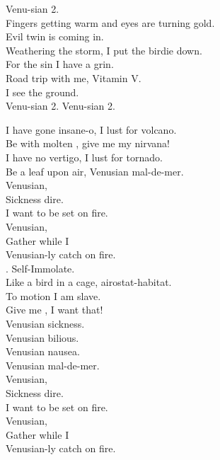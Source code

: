 Venu-sian 2. \\

Fingers getting warm and eyes are turning gold. \\
Evil twin is coming in. \\
Weathering the storm, I put the birdie down. \\
For the sin I have a grin. \\

Road trip with me, Vitamin V. \\
I see the ground. \\

Venu-sian 2. Venu-sian 2. \\





I have gone insane-o, I lust for volcano. \\
Be with molten , give me my nirvana! \\
I have no vertigo, I lust for tornado. \\
Be a leaf upon air, Venusian mal-de-mer. \\

Venusian, \\
Sickness dire. \\
I want to be set on fire. \\
Venusian, \\
Gather while I \\
Venusian-ly catch on fire. \\

. Self-Immolate. \\

Like a bird in a cage, airostat-habitat. \\
To motion I am slave. \\
Give me , I want that! \\
Venusian sickness. \\
Venusian bilious. \\
Venusian nausea. \\
Venusian mal-de-mer. \\

Venusian, \\
Sickness dire. \\
I want to be set on fire. \\
Venusian, \\
Gather while I \\
Venusian-ly catch on fire. \\

